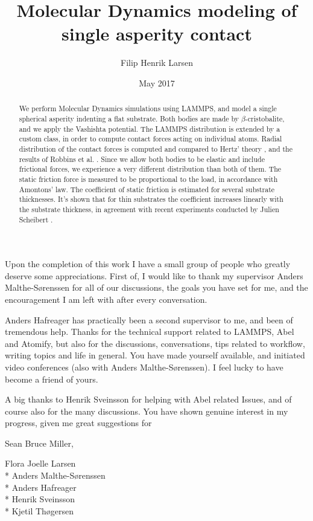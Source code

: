\documentclass[twoside,english]{uiofysmaster}
\author{Filip Henrik Larsen}
\title{Molecular Dynamics modeling of single asperity contact}
\date{May 2017}
\begin{document}
\maketitle

\begin{abstract}
We perform Molecular Dynamics simulations using LAMMPS, and model a single spherical asperity indenting a flat substrate.
Both bodies are made by $\beta$-cristobalite, and we apply the Vashishta potential.
The LAMMPS distribution is extended by a custom class, in order to compute contact forces acting on individual atoms.  
Radial distribution of the contact forces is computed and compared to Hertz' theory \cite{Johnson1985}, and the results of Robbins et al. \cite{RobbinsSingleAsperity}. 
Since we allow both bodies to be elastic and include frictional forces, we experience a very different distribution than both of them. 
The static friction force is measured to be proportional to the load, in accordance with Amontons' law.
The coefficient of static friction is estimated for several substrate thicknesses. 
It's shown that for thin substrates the coefficient increases linearly with the substrate thickness, in agreement with recent experiments conducted by Julien Scheibert \cite{Scheibert2017}.




   
\end{abstract}


\begin{acknowledgements}
Upon the completion of this work I have a small group of people who greatly deserve some appreciations. 
First of, I would like to thank my supervisor Anders Malthe-Sørenssen for all of our discussions, the goals you have set for me, and the encouragement I am left with after every conversation.

Anders Hafreager has practically been a second supervisor to me, and been of tremendous help. 
Thanks for the technical support related to LAMMPS, Abel and Atomify, but also for the discussions, conversations, tips related to workflow, writing topics and life in general. 
You have made yourself available, and initiated video conferences (also with Anders Malthe-Sørenssen).
I feel lucky to have become a friend of yours. 

A big thanks to Henrik Sveinsson for helping with Abel related Issues, and of course also for the many discussions. You have shown genuine interest in my progress, given me great suggestions for 

Sean Bruce Miller,   


	
	
	
  Flora Joelle Larsen\\*
  Anders Malthe-Sørenssen \\*
  Anders Hafreager \\*
  Henrik Sveinsson \\*
  Kjetil Thøgersen
\end{acknowledgements}
{
\hypersetup{linkcolor = black}
\tableofcontents
}
\end{document}
